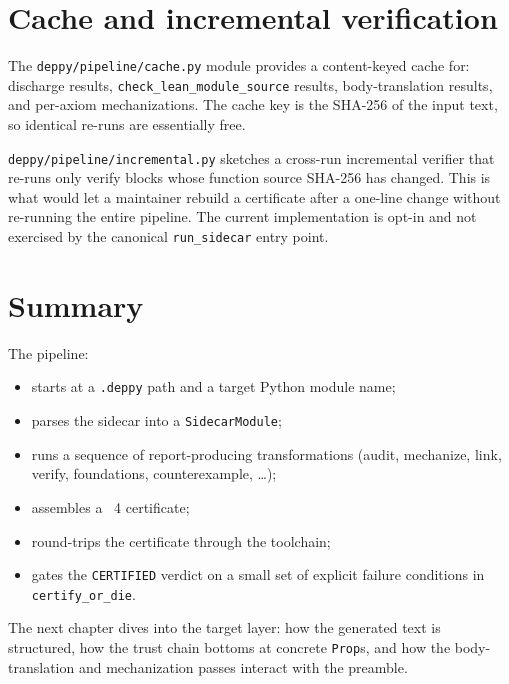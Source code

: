 \section{Cache and incremental verification}

The \texttt{deppy/pipeline/cache.py} module provides a content-keyed
cache for: \Zthree{} discharge results,
\texttt{check\_lean\_module\_source} results, body-translation
results, and per-axiom mechanizations.  The cache key is the
SHA-256 of the input text, so identical re-runs are essentially
free.

\texttt{deppy/pipeline/incremental.py} sketches a cross-run
incremental verifier that re-runs only verify blocks whose
function source SHA-256 has changed.  This is what would let a
maintainer rebuild a certificate after a one-line change without
re-running the entire pipeline.  The current implementation is
opt-in and not exercised by the canonical \texttt{run\_sidecar}
entry point.

\section{Summary}

The pipeline:
\begin{itemize}[leftmargin=1.7em]
  \item starts at a \texttt{.deppy} path and a target Python module
    name;
  \item parses the sidecar into a \texttt{SidecarModule};
  \item runs a sequence of report-producing transformations
    (audit, mechanize, link, verify, foundations, counterexample,
    \dots);
  \item assembles a \Lean{}~4 certificate;
  \item round-trips the certificate through the \Lean{} toolchain;
  \item gates the \texttt{CERTIFIED} verdict on a small set of
    explicit failure conditions in \texttt{certify\_or\_die}.
\end{itemize}

The next chapter dives into the \Lean{} target layer: how the
generated text is structured, how the trust chain bottoms at
concrete \Lean{} \texttt{Prop}s, and how the body-translation and
mechanization passes interact with the preamble.
